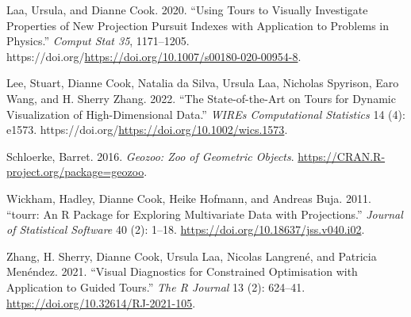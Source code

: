 \begin{CSLReferences}{1}{0}
\leavevmode{}%
Laa, Ursula, and Dianne Cook. 2020. {``Using Tours to Visually Investigate Properties of New Projection Pursuit Indexes with Application to Problems in Physics.''} \emph{Comput Stat 35}, 1171--1205. https://doi.org/\url{https://doi.org/10.1007/s00180-020-00954-8}.

\leavevmode{}%
Lee, Stuart, Dianne Cook, Natalia da Silva, Ursula Laa, Nicholas Spyrison, Earo Wang, and H. Sherry Zhang. 2022. {``The State-of-the-Art on Tours for Dynamic Visualization of High-Dimensional Data.''} \emph{WIREs Computational Statistics} 14 (4): e1573. https://doi.org/\url{https://doi.org/10.1002/wics.1573}.

\leavevmode{}%
Schloerke, Barret. 2016. \emph{Geozoo: Zoo of Geometric Objects}. \url{https://CRAN.R-project.org/package=geozoo}.

\leavevmode{}%
Wickham, Hadley, Dianne Cook, Heike Hofmann, and Andreas Buja. 2011. {``{tourr}: An {R} Package for Exploring Multivariate Data with Projections.''} \emph{Journal of Statistical Software} 40 (2): 1--18. \url{https://doi.org/10.18637/jss.v040.i02}.

\leavevmode{}%
Zhang, H. Sherry, Dianne Cook, Ursula Laa, Nicolas Langrené, and Patricia Menéndez. 2021. {``Visual Diagnostics for Constrained Optimisation with Application to Guided Tours.''} \emph{The R Journal} 13 (2): 624--41. \url{https://doi.org/10.32614/RJ-2021-105}.

\end{CSLReferences}



\address{%
Zoljargal Batsaikhan\\
Monash University\\%
Department of Econometrics and Business Statistics\\ Clayton, VIC, Australia\\
%
\url{https://github.com/zolabat}\\%
\textit{ORCiD: \href{https://orcid.org/0009-0005-0055-1448}{0009-0005-0055-1448}}\\%
\href{mailto:zoljargal11@gmail.com}{\nolinkurl{zoljargal11@gmail.com}}%
}

\address{%
Dianne Cook\\
Monash University\\%
Department of Econometrics and Business Statistics\\ Clayton, VIC, Australia\\
%
\url{http://www.dicook.org}\\%
\textit{ORCiD: \href{https://orcid.org/0000-0002-3813-7155}{0000-0002-3813-7155}}\\%
\href{mailto:dicook@monash.edu}{\nolinkurl{dicook@monash.edu}}%
}

